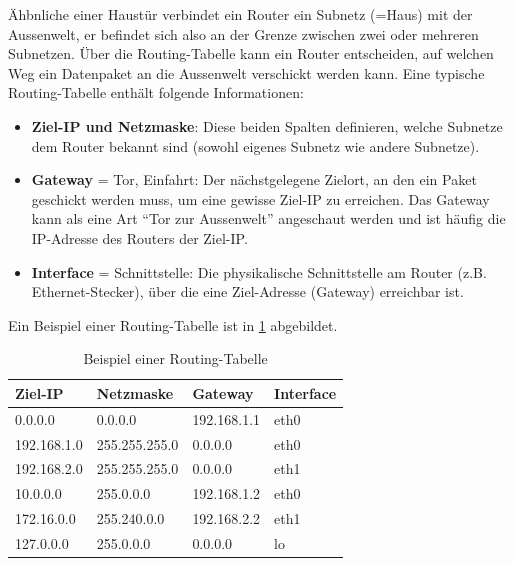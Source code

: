 Ähbnliche einer Haustür verbindet ein Router ein Subnetz (=Haus) mit der Aussenwelt, er befindet sich also an der Grenze zwischen zwei oder mehreren Subnetzen. Über die Routing-Tabelle kann ein Router entscheiden, auf welchen Weg ein Datenpaket an die Aussenwelt verschickt werden kann. Eine typische Routing-Tabelle enthält folgende Informationen:

\begin{itemize}
	\item \textbf{Ziel-\gls{IP} und Netzmaske}: Diese beiden Spalten definieren, welche Subnetze dem Router bekannt sind (sowohl eigenes Subnetz wie andere Subnetze).
	\item \textbf{Gateway} = Tor, Einfahrt: Der nächstgelegene Zielort, an den ein Paket geschickt werden muss, um eine gewisse Ziel-\gls{IP} zu erreichen. Das Gateway kann als eine Art ``Tor zur Aussenwelt'' angeschaut werden und ist häufig die \gls{IP}-Adresse des Routers der Ziel-\gls{IP}.
	\item \textbf{Interface} = Schnittstelle: Die physikalische Schnittstelle am Router (z.B. Ethernet-Stecker), über die eine Ziel-Adresse (Gateway) erreichbar ist.
\end{itemize}

Ein Beispiel einer Routing-Tabelle ist in \cref{table:routing} abgebildet.

\begin{table}[H]
	\centering
	\begin{tabular}{ l | l || l | l}
		\textbf{Ziel-IP} & \textbf{Netzmaske} & \textbf{Gateway} & \textbf{Interface} \\
		\midrule\midrule
		0.0.0.0          & 0.0.0.0            & 192.168.1.1      & eth0               \\
		192.168.1.0      & 255.255.255.0      & 0.0.0.0          & eth0               \\
		192.168.2.0      & 255.255.255.0      & 0.0.0.0          & eth1               \\
		10.0.0.0         & 255.0.0.0          & 192.168.1.2      & eth0               \\
		172.16.0.0       & 255.240.0.0        & 192.168.2.2      & eth1               \\
		127.0.0.0        & 255.0.0.0          & 0.0.0.0          & lo                 \\
	\end{tabular}
	\caption{Beispiel einer Routing-Tabelle}
	\label{table:routing}
\end{table}



